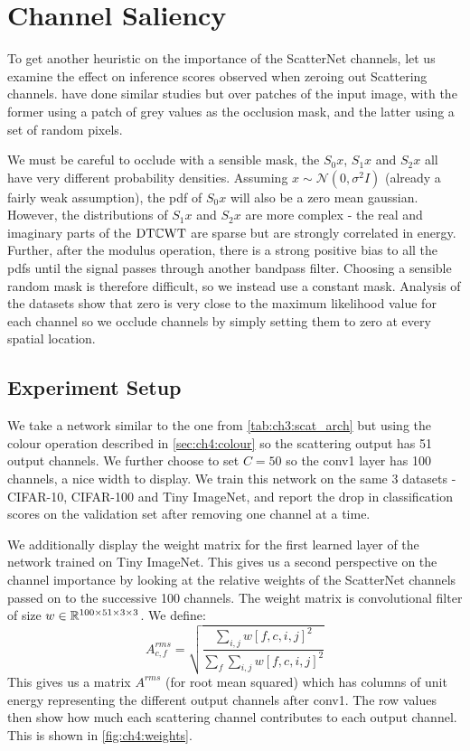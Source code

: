\section{Channel Saliency}\label{sec:ch4:occlusion}
To get another heuristic on the importance of the ScatterNet channels, let us examine
the effect on inference scores observed when zeroing out Scattering channels.
\cite{zeiler_visualizing_2014, zhou_object_2014} have done similar studies but
over patches of the input image, with the former using a patch of grey values as
the occlusion mask, and the latter using a set of random pixels. 

We must be careful to occlude with a sensible mask, the $S_0x$, $S_1x$ and $S_2x$
all have very different probability densities. Assuming $x \sim \mathcal{N}(0, \sigma^2I)$ 
(already a fairly weak assumption),
the pdf of $S_0x$ will also be a zero mean gaussian. However, the distributions
of $S_1x$ and $S_2x$ are more complex - the real and imaginary parts of the
$\DTCWT$ are sparse but are strongly correlated in energy. Further, after the modulus operation,
there is a strong positive bias to all the pdfs until the signal passes through
another bandpass filter. Choosing a sensible random mask is
therefore difficult, so we instead use a constant mask. Analysis of the
datasets show that zero is very close to the maximum likelihood value for each
channel so we occlude channels by simply setting them to zero at every spatial
location.

\subsection{Experiment Setup}
We take a network similar to the one from
\autoref{tab:ch3:scat_arch} but using the colour operation described in 
\autoref{sec:ch4:colour} so the scattering output has 51 output channels. We further
choose to set $C=50$ so the conv1 layer has 100 channels, a nice width to
display. We train this network
on the same 3 datasets - CIFAR-10, CIFAR-100 and Tiny ImageNet, and report the
drop in classification scores on the validation set after removing one channel at
a time. 

We additionally display the weight matrix for the first learned layer of the
network trained on Tiny ImageNet. This gives us a second perspective on the
channel importance by looking at the relative weights of the ScatterNet channels
passed on to the successive 100 channels. The weight matrix is convolutional
filter of size $w \in \reals[100\x 51\x 3\x 3]$. We define:
\begin{equation}\label{eq:ch4:arms}
  A^{rms}_{c, f} = \sqrt{ \frac{\sum_{i,j} w[f, c, i, j]^2}{{\sum_f \sum_{i,j} w[f, c, i, j]^2}} }
\end{equation}
This gives us a matrix $A^{rms}$ (for root mean squared) which has columns of
unit energy representing the different output channels after conv1. The row
values then show how much each scattering channel contributes to each output
channel. This is shown in \autoref{fig:ch4:weights}.

